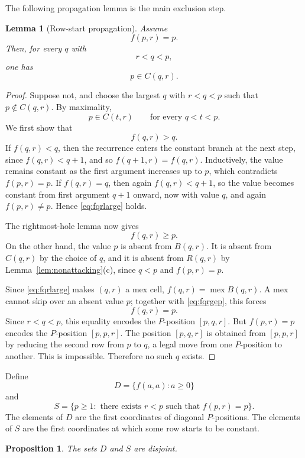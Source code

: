\documentclass[11pt]{article}
\newtheorem{lemma}[theorem]{Lemma}
\newtheorem{proposition}[theorem]{Proposition}
\newcommand{\Mex}{\operatorname{mex}}
\begin{document}
The following propagation lemma is the main exclusion step.

\begin{lemma}[Row-start propagation]\label{lem:rowstartpropagation}
Assume
\[
        f(p,r)=p.
\]
Then, for every $q$ with
\[
        r<q<p,
\]
one has
\[
        p\in C(q,r).
\]
\end{lemma}

\begin{proof}
Suppose not, and choose the largest $q$ with $r<q<p$ such that
$p\notin C(q,r)$. By maximality,
\[
        p\in C(t,r)\qquad\text{for every }q<t<p.
\]
We first show that
\begin{equation}\label{eq:fqrlarge}
        f(q,r)>q.
\end{equation}
If $f(q,r)<q$, then the recurrence enters the constant branch at the next
step, since $f(q,r)<q+1$, and so $f(q+1,r)=f(q,r)$. Inductively, the value remains constant as the first argument increases up to
$p$, which contradicts $f(p,r)=p$. If
$f(q,r)=q$, then again $f(q,r)<q+1$, so the value becomes constant from first argument $q+1$ onward, now with
value $q$, and again $f(p,r)\ne p$. Hence
\eqref{eq:fqrlarge} holds.

The rightmost-hole lemma now gives
\begin{equation}\label{eq:fqrgep}
        f(q,r)\ge p.
\end{equation}
On the other hand, the value $p$ is absent from $B(q,r)$. It is absent from
$C(q,r)$ by the choice of $q$, and it is absent from $R(q,r)$ by
Lemma~\ref{lem:nonattacking}(c), since $q<p$ and $f(p,r)=p$.

Since \eqref{eq:fqrlarge} makes $(q,r)$ a mex cell, $f(q,r)=\Mex B(q,r)$. A
mex cannot skip over an absent value $p$; together with \eqref{eq:fqrgep},
this forces
\[
        f(q,r)=p.
\]
Since $r<q<p$, this equality encodes the $P$-position $[p,q,r]$. But
$f(p,r)=p$ encodes the $P$-position $[p,p,r]$. The position $[p,q,r]$ is
obtained from $[p,p,r]$ by reducing the second row from $p$ to $q$, a legal
move from one $P$-position to another. This is impossible. Therefore no such
$q$ exists.
\end{proof}

Define
\[
        D=\{f(a,a):a\ge 0\}
\]
and
\[
        S=\{p\ge 1:\text{ there exists } r<p \text{ such that } f(p,r)=p\}.
\]
The elements of $D$ are the first coordinates of diagonal $P$-positions. The
elements of $S$ are the first coordinates at which some row starts to be
constant.

\begin{proposition}\label{prop:disjoint}
The sets $D$ and $S$ are disjoint.
\end{proposition}
\end{document}
